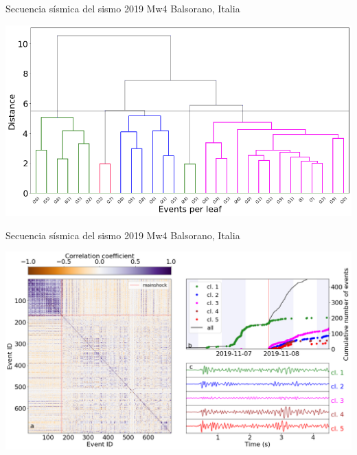 \documentclass{beamer}
\begin{document}
\begin{frame}
 {Secuencia s\'ismica del sismo 2019 Mw4 Balsorano, Italia}

 \begin{minipage}{1\linewidth}
  \centering \includegraphics[width=1\linewidth]{images/dendrogram_balsorano.png}
 \end{minipage} 
 
\end{frame}


\begin{frame}
 {Secuencia s\'ismica del sismo 2019 Mw4 Balsorano, Italia}

 \begin{minipage}{1\linewidth}
  \centering \includegraphics[width=1\linewidth]{images/wigg_cc_mat_cluster.png}
 \end{minipage} 
 
\end{frame}
\end{document}
